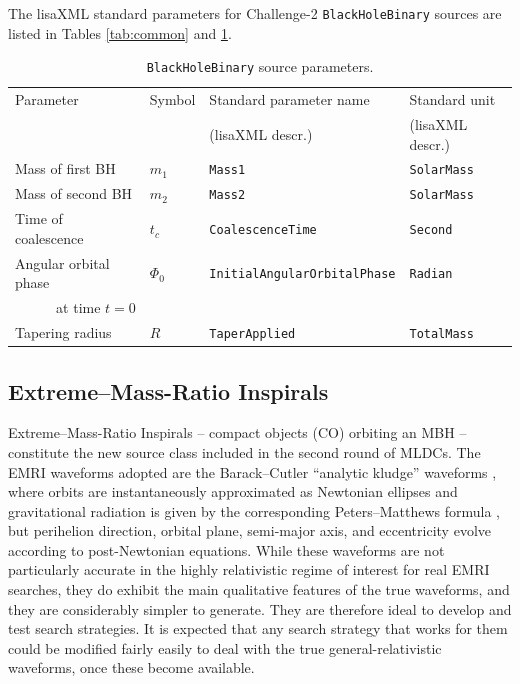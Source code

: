 \documentclass[12pt]{iopart}
\begin{document}
The lisaXML standard parameters for Challenge-2 \texttt{BlackHoleBinary} sources are listed in Tables \ref{tab:common} and \ref{tab:bbh}.
%
\begin{table}
\begin{tabular}{llll}
\hline
{Parameter} &
{Symbol} &
{Standard parameter name} &
{Standard unit} \\
& & (lisaXML descr.) & (lisaXML descr.) \\
\hline
Mass of first BH    & $m_1$  & \texttt{Mass1}           & \texttt{SolarMass} \\
Mass of second BH   & $m_2$  & \texttt{Mass2}           & \texttt{SolarMass} \\
Time of coalescence & $t_c$  & \texttt{CoalescenceTime} & \texttt{Second} \\
Angular orbital phase & $\Phi_0$ & \texttt{InitialAngularOrbitalPhase} & \texttt{Radian} \\
\multicolumn{1}{r}{at time $t = 0$} & & & \\
Tapering radius & $R$    & \texttt{TaperApplied}    & \texttt{TotalMass} \\ 
\hline
\end{tabular}
\caption{\texttt{BlackHoleBinary} source parameters.\label{tab:bbh}}
\end{table}

\subsection{Extreme--Mass-Ratio Inspirals}

Extreme--Mass-Ratio Inspirals -- compact objects (CO) orbiting an MBH -- constitute the new source class included in the second round of MLDCs. The EMRI waveforms adopted are the Barack--Cutler ``analytic kludge'' waveforms \cite{BC}, where orbits are instantaneously approximated as Newtonian ellipses and gravitational radiation is given by the corresponding Peters--Matthews formula \cite{pm}, but perihelion direction, orbital plane, semi-major axis, and eccentricity evolve according to post-Newtonian equations. While these waveforms are not particularly accurate in the highly relativistic regime of interest for real EMRI searches, they do exhibit the main qualitative features of the true waveforms, and they are considerably simpler to generate.  They are therefore ideal to develop and test search strategies. It is expected that any search strategy that works for them could be modified fairly easily to deal with the true general-relativistic waveforms, once these become available.
\end{document}
